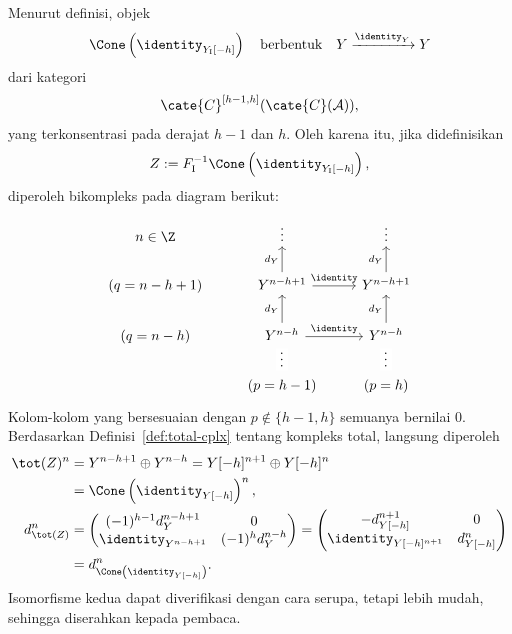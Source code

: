 \begin{bukti}
	Menurut definisi, objek
	\[
		\Cone\left( \identity_{Y_{\mathrm{I}}[-h]} \right)
		\quad\text{berbentuk}\quad
		Y \xrightarrow{\identity_Y} Y
	\]
	dari kategori
	\[
		\cate{C}^{[h-1, h]}(\cate{C}(\mathcal{A})),
	\]
	yang terkonsentrasi pada derajat $h-1$ dan $h$. Oleh karena itu, jika didefinisikan
	\[
		Z := F_{\mathrm{I}}^{-1}
		\Cone\left( \identity_{Y_{\mathrm{I}}[-h]} \right),
	\]
	diperoleh bikompleks pada diagram berikut:
	\[\begin{tikzcd}
		n \in \Z & \vdots & \vdots \\
		(q = n-h+1) & Y^{n-h+1} \arrow[u, "d_Y"] \arrow[r, "\identity"] & Y^{n-h+1} \arrow[u, "d_Y"] \\
		(q = n-h) & Y^{n-h} \arrow[r, "\identity"] \arrow[u, "d_Y"] & Y^{n-h} \arrow[u, "d_Y"] \\
		& (p = h-1) \arrow[phantom, u, "\cdots" description, sloped] & (p = h) \arrow[phantom, u, "\cdots" description, sloped]
	\end{tikzcd}\]
	Kolom-kolom yang bersesuaian dengan $p \notin \{h-1, h\}$ semuanya
	bernilai $0$. Berdasarkan Definisi~\ref{def:total-cplx} tentang kompleks
	total, langsung diperoleh
	\begin{align*}
		\tot(Z)^n & = Y^{n-h+1} \oplus Y^{n-h} = Y[-h]^{n+1} \oplus Y[-h]^n \\
		& = \Cone\left( \identity_{Y[-h]} \right)^n , \\
		d_{\tot(Z)}^n & = \begin{pmatrix}
			(-1)^{h-1} d_Y^{n-h+1} & 0 \\
			\identity_{Y^{n-h+1}} & (-1)^{h} d_Y^{n-h}
		\end{pmatrix}
		= \begin{pmatrix}
			- d_{Y[-h]}^{n+1} & 0 \\
			\identity_{Y[-h]^{n+1}} & d_{Y[-h]}^n
		\end{pmatrix} \\
		& = d_{\Cone\left( \identity_{Y[-h]} \right)}^n .
	\end{align*}
	Isomorfisme kedua dapat diverifikasi dengan cara serupa, tetapi lebih
	mudah, sehingga diserahkan kepada pembaca.
\end{bukti}

